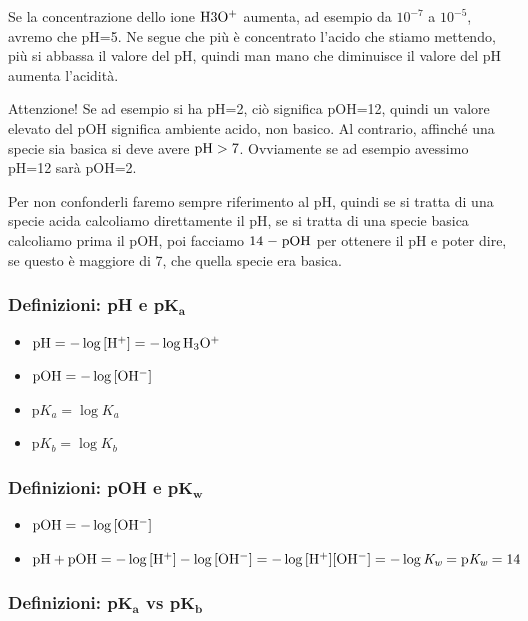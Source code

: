 Se la concentrazione dello ione $\rm H3O^+$ aumenta, ad esempio da $10^{-7}$ a $10^{-5}$, avremo che pH=5. Ne segue che più è concentrato l'acido che stiamo mettendo, più si abbassa il valore del pH, quindi man mano che diminuisce il valore del pH aumenta l'acidità.

Attenzione! Se ad esempio si ha pH=2, ciò significa pOH=12, quindi un valore elevato del pOH significa ambiente acido, non basico. Al contrario, affinché una specie sia basica si deve avere $\rm pH > 7$. Ovviamente se ad esempio avessimo pH=12 sarà pOH=2.

Per non confonderli faremo sempre riferimento al pH, quindi se si tratta di una specie acida calcoliamo direttamente il pH, se si tratta di una specie basica calcoliamo prima il pOH, poi facciamo $\rm 14 \hspace{0.2mm}-\hspace{0.2mm} pOH$ per ottenere il pH e poter dire, se questo è maggiore di 7, che quella specie era basica.

\subsubsection{Definizioni: pH e p$\boldsymbol{K_a}$}

\begin{itemize}
    \item $\rm pH=-\log{[H^+]}=-\log{H_3O^+}$
    \item $\rm pOH=-\log{[OH^-]}$
    \item $\text{p}K_a=\log{K_a}$
    \item $\text{p}K_b=\log{K_b}$
\end{itemize}

\subsubsection{Definizioni: pOH e p$\boldsymbol{K_w}$}

\begin{itemize}
    \item $\rm pOH=-\log{[OH^-]}$
    \item $\rm pH + pOH=-\log{[H^+]} - \log{[OH^-]}=-\log{[H^+][OH^-]}=-\log{\textit{K}_{\textit{w}}}=p\textit{K}_{\textit{w}}=14$
\end{itemize}

\subsubsection{Definizioni: p$\boldsymbol{K_a}$ vs p$\boldsymbol{K_b}$}

